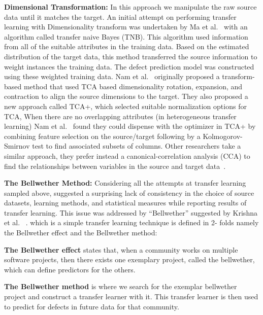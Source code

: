    
\textbf{Dimensional Transformation:} In this approach we manipulate the raw source data until it matches the target. An initial attempt on performing transfer learning with Dimensionality transform was undertaken by Ma et al.~\cite{Ma2012} with an algorithm called transfer naive Bayes (TNB). This algorithm used information from all of the suitable attributes in the training data. Based on the estimated distribution of the target data, this method transferred the source information to weight instances the training data. The defect prediction model was constructed using these weighted training data. Nam et al.~\cite{Nam13} originally proposed a transform-based method that used TCA based dimensionality rotation, expansion, and contraction to align the source dimensions to the target. They also proposed a new approach called TCA+, which selected suitable normalization options for TCA, When there are no overlapping attributes (in heterogeneous transfer learning) Nam et al.~\cite{Nam2015} found they could dispense with the optimizer in TCA+ by combining feature selection on the source/target following by a Kolmogorov-Smirnov test to find associated subsets of columns. Other researchers take a similar approach, they prefer instead a canonical-correlation analysis (CCA) to find the relationships between variables in the source and target data~\cite{jing2015heterogeneous}.

\textbf{The Bellwether Method:}
Considering all the attempts at transfer learning sampled above, suggested a surprising lack of consistency in the choice of source datasets, learning methods, and statistical measures while reporting results of transfer learning. This issue was addressed by ``Bellwether'' suggested by Krishna et al. ~\cite{krishna2017simpler,KrishnaMF16}. which is a simple transfer learning technique is defined in 2- folds namely the Bellwether effect and the Bellwether method:

\bi

    \item \textbf{The Bellwether effect} states that, when a community works on multiple software projects,  then there exists one exemplary project, called the bellwether, which can define predictors for the others.
    
    \item \textbf{The Bellwether method} is where we search for the exemplar bellwether project and construct a transfer learner with it. This transfer learner is then used to predict for defects in future data for that community.

